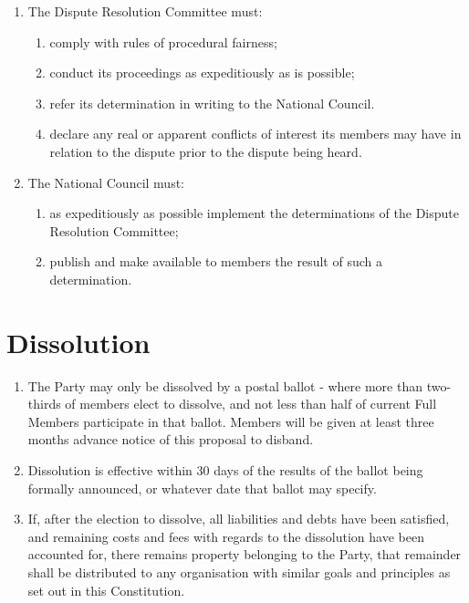 \documentclass[a4paper,titlepage,8.5pt]{article}
\begin{document}
\begin{enumerate}
\begin{enumerate}
\end{enumerate}
\item The Dispute Resolution Committee must:
\begin{enumerate}
\item comply with rules of procedural fairness;
\item conduct its proceedings as expeditiously as is possible;
\item refer its determination in writing to the National Council.
\item declare any real or apparent conflicts of interest its members may have in relation to the dispute prior to the dispute being heard.
\end{enumerate}
\item The National Council must:
\begin{enumerate}
\item as expeditiously as possible implement the determinations of the Dispute Resolution Committee;
\item publish and make available to members the result of such a determination.
\end{enumerate}
\end{enumerate}

\section{Dissolution}

\begin{enumerate}
\item The Party may only be dissolved by a postal ballot - where more than two-thirds of members elect to dissolve, and not less than half of current Full Members participate in that ballot. Members will be given at least three months advance notice of this proposal to disband.
\item Dissolution is effective within 30 days of the results of the ballot being formally announced, or whatever date that ballot may specify.
\item If, after the election to dissolve, all liabilities and debts have been satisfied, and remaining costs and fees with regards to the dissolution have been accounted for, there remains property belonging to the Party, that remainder shall be distributed to any organisation with similar goals and principles as set out in this Constitution.
\end{enumerate}
\end{document}
